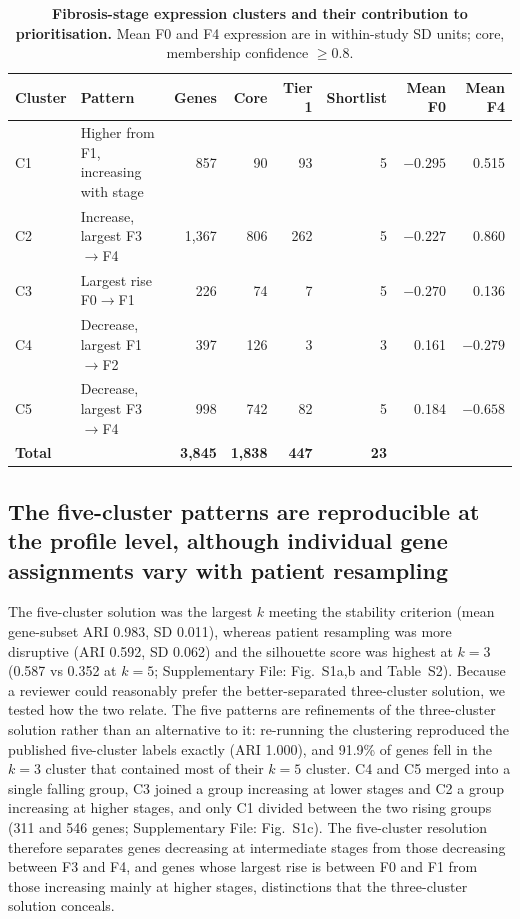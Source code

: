 \documentclass[11pt,a4paper]{article}
\begin{document}
\begin{table}[!t]\centering
\caption{\textbf{Fibrosis-stage expression clusters and their contribution to prioritisation.} Mean F0 and F4 expression are in within-study SD units; core, membership confidence $\geq0.8$.}\label{tab:clusters}
\small\setlength{\tabcolsep}{5pt}\renewcommand{\arraystretch}{1.2}
\begin{tabular}{llrrrrrr}
\toprule
\rowcolor{white}\textbf{Cluster} & \textbf{Pattern} & \textbf{Genes} & \textbf{Core} & \textbf{Tier 1} & \textbf{Shortlist} & \textbf{Mean F0} & \textbf{Mean F4} \\
\midrule
C1 & Higher from F1, increasing with stage & 857 & 90 & 93 & 5 & $-0.295$ & 0.515 \\
C2 & Increase, largest F3$\rightarrow$F4 & 1,367 & 806 & 262 & 5 & $-0.227$ & 0.860 \\
C3 & Largest rise F0$\rightarrow$F1 & 226 & 74 & 7 & 5 & $-0.270$ & 0.136 \\
C4 & Decrease, largest F1$\rightarrow$F2 & 397 & 126 & 3 & 3 & 0.161 & $-0.279$ \\
C5 & Decrease, largest F3$\rightarrow$F4 & 998 & 742 & 82 & 5 & 0.184 & $-0.658$ \\
\midrule
\rowcolor{white}\textbf{Total} & & \textbf{3,845} & \textbf{1,838} & \textbf{447} & \textbf{23} & & \\
\bottomrule
\end{tabular}
\end{table}

\subsection*{The five-cluster patterns are reproducible at the profile level, although individual gene assignments vary with patient resampling}
The five-cluster solution was the largest $k$ meeting the stability criterion (mean gene-subset ARI 0.983, SD 0.011), whereas patient resampling was more disruptive (ARI 0.592, SD 0.062) and the silhouette score was highest at $k=3$ (0.587 vs 0.352 at $k=5$; Supplementary File: Fig.~S1a,b and Table~S2). Because a reviewer could reasonably prefer the better-separated three-cluster solution, we tested how the two relate. The five patterns are refinements of the three-cluster solution rather than an alternative to it: re-running the clustering reproduced the published five-cluster labels exactly (ARI 1.000), and 91.9\% of genes fell in the $k=3$ cluster that contained most of their $k=5$ cluster. C4 and C5 merged into a single falling group, C3 joined a group increasing at lower stages and C2 a group increasing at higher stages, and only C1 divided between the two rising groups (311 and 546 genes; Supplementary File: Fig.~S1c). The five-cluster resolution therefore separates genes decreasing at intermediate stages from those decreasing between F3 and F4, and genes whose largest rise is between F0 and F1 from those increasing mainly at higher stages, distinctions that the three-cluster solution conceals.
\end{document}
